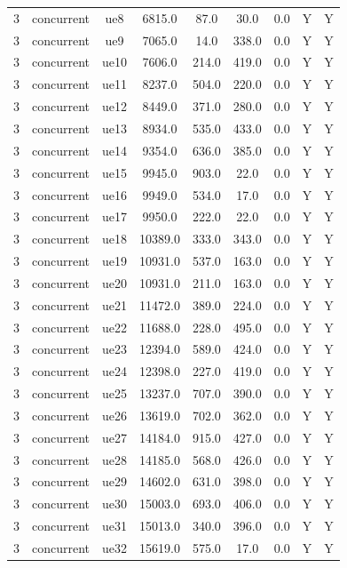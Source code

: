 \begin{table}[ht]
\begin{tabular}{|c|c|c|c|c|c|c|c|c|}
3 & concurrent & ue8 & 6815.0 & 87.0 & 30.0 & 0.0 & Y & Y \\
3 & concurrent & ue9 & 7065.0 & 14.0 & 338.0 & 0.0 & Y & Y \\
3 & concurrent & ue10 & 7606.0 & 214.0 & 419.0 & 0.0 & Y & Y \\
3 & concurrent & ue11 & 8237.0 & 504.0 & 220.0 & 0.0 & Y & Y \\
3 & concurrent & ue12 & 8449.0 & 371.0 & 280.0 & 0.0 & Y & Y \\
3 & concurrent & ue13 & 8934.0 & 535.0 & 433.0 & 0.0 & Y & Y \\
3 & concurrent & ue14 & 9354.0 & 636.0 & 385.0 & 0.0 & Y & Y \\
3 & concurrent & ue15 & 9945.0 & 903.0 & 22.0 & 0.0 & Y & Y \\
3 & concurrent & ue16 & 9949.0 & 534.0 & 17.0 & 0.0 & Y & Y \\
3 & concurrent & ue17 & 9950.0 & 222.0 & 22.0 & 0.0 & Y & Y \\
3 & concurrent & ue18 & 10389.0 & 333.0 & 343.0 & 0.0 & Y & Y \\
3 & concurrent & ue19 & 10931.0 & 537.0 & 163.0 & 0.0 & Y & Y \\
3 & concurrent & ue20 & 10931.0 & 211.0 & 163.0 & 0.0 & Y & Y \\
3 & concurrent & ue21 & 11472.0 & 389.0 & 224.0 & 0.0 & Y & Y \\
3 & concurrent & ue22 & 11688.0 & 228.0 & 495.0 & 0.0 & Y & Y \\
3 & concurrent & ue23 & 12394.0 & 589.0 & 424.0 & 0.0 & Y & Y \\
3 & concurrent & ue24 & 12398.0 & 227.0 & 419.0 & 0.0 & Y & Y \\
3 & concurrent & ue25 & 13237.0 & 707.0 & 390.0 & 0.0 & Y & Y \\
3 & concurrent & ue26 & 13619.0 & 702.0 & 362.0 & 0.0 & Y & Y \\
3 & concurrent & ue27 & 14184.0 & 915.0 & 427.0 & 0.0 & Y & Y \\
3 & concurrent & ue28 & 14185.0 & 568.0 & 426.0 & 0.0 & Y & Y \\
3 & concurrent & ue29 & 14602.0 & 631.0 & 398.0 & 0.0 & Y & Y \\
3 & concurrent & ue30 & 15003.0 & 693.0 & 406.0 & 0.0 & Y & Y \\
3 & concurrent & ue31 & 15013.0 & 340.0 & 396.0 & 0.0 & Y & Y \\
3 & concurrent & ue32 & 15619.0 & 575.0 & 17.0 & 0.0 & Y & Y \\

\end{tabular}
\end{table}
